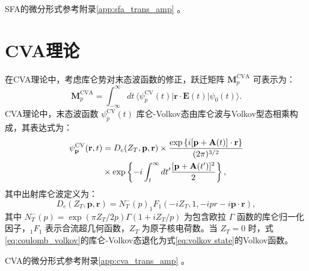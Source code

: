SFA的微分形式参考附录\ref{app:sfa_trans_amp} 。

\section{CVA理论}
在CVA理论中，考虑库仑势对末态波函数的修正，跃迁矩阵 $\mathbf{M}_p^{\text{CVA}}$ 可表示为：  
\begin{equation}  
\mathbf{M}_p^{\text{CVA}} = \int_{-\infty}^{\infty} dt \, \langle \psi_p^{\text{CV}}(t) | \mathbf{r} \cdot \mathbf{E}(t) | \psi_0(t) \rangle. \label{eq:primal M_p_cva}  
\end{equation}  
CVA理论中，末态波函数 $\psi_p^{\text{CV}}(t)$ 库仑-Volkov态由库仑波与Volkov型态相乘构成，其表达式为：  
\begin{equation}  
\begin{split}
\psi_{\mathbf{p}}^{\rm CV}(\mathbf{r},t) 
& = D_c(Z_T, \mathbf{p}, \mathbf{r}) \times \frac{\exp\left\{i[\mathbf{p} + \mathbf{A}(t)] \cdot \mathbf{r}\right\}}{(2\pi)^{3/2}} \\
& \times \exp\left\{-i \int_t^\infty dt' \frac{[\mathbf{p} + \mathbf{A}(t')]^2}{2}\right\}, \label{eq:coulomb_volkov}  
\end{split}
\end{equation}  
其中出射库仑波定义为：  
\begin{equation}  
D_c(Z_T, \mathbf{p}, \mathbf{r}) = N_T^-(p)_1 F_1(-iZ_T, 1, -ipr - i\mathbf{p} \cdot \mathbf{r}), \label{eq:outgoing wave}
\end{equation}  
其中 $N_T^-(p) = \exp(\pi Z_T/2p)\Gamma(1+iZ_T/p)$ 为包含欧拉 $\Gamma$ 函数的库仑归一化因子，$_1F_1$ 表示合流超几何函数，$Z_T$ 为原子核电荷数。当 $Z_T=0$ 时，式\eqref{eq:coulomb_volkov}的库仑-Volkov态退化为式\eqref{eq:volkov state}的Volkov函数。

CVA的微分形式参考附录\ref{app:cva_trans_amp} 。